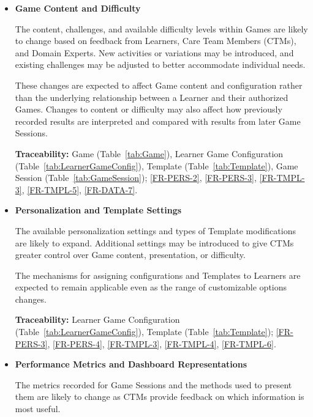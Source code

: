 \documentclass[12pt]{article}
\newcounter{lcnum} %
\begin{document}
\noindent \begin{itemize}

\item[LC\refstepcounter{lcnum}\thelcnum
  \label{LC_GameContent}:] \textbf{Game Content and Difficulty}

The content, challenges, and available difficulty levels within Games are likely
to change based on feedback from Learners, Care Team Members (CTMs), and Domain
Experts. New activities or variations may be introduced, and existing challenges
may be adjusted to better accommodate individual needs.

These changes are expected to affect Game content and configuration rather than
the underlying relationship between a Learner and their authorized Games.
Changes to content or difficulty may also affect how previously recorded results
are interpreted and compared with results from later Game Sessions.

\textbf{Traceability:} Game (Table~\ref{tab:Game}), Learner Game Configuration
(Table~\ref{tab:LearnerGameConfig}), Template (Table~\ref{tab:Template}), Game
Session (Table~\ref{tab:GameSession}); \ref{FR-PERS-2}, \ref{FR-PERS-3},
\ref{FR-TMPL-3}, \ref{FR-TMPL-5}, \ref{FR-DATA-7}.

\item[LC\refstepcounter{lcnum}\thelcnum
  \label{LC_Personalization}:] \textbf{Personalization and Template Settings}

The available personalization settings and types of Template modifications are
likely to expand. Additional settings may be introduced to give CTMs greater
control over Game content, presentation, or difficulty.

The mechanisms for assigning configurations and Templates to Learners are
expected to remain applicable even as the range of customizable options changes.

\textbf{Traceability:} Learner Game Configuration
(Table~\ref{tab:LearnerGameConfig}), Template (Table~\ref{tab:Template});
\ref{FR-PERS-3}, \ref{FR-PERS-4}, \ref{FR-TMPL-3}, \ref{FR-TMPL-4},
\ref{FR-TMPL-6}.

\item[LC\refstepcounter{lcnum}\thelcnum
  \label{LC_PerformanceMetrics}:] \textbf{Performance Metrics and Dashboard
Representations}

The metrics recorded for Game Sessions and the methods used to present them are
likely to change as CTMs provide feedback on which information is most useful.


\end{itemize}
\end{document}
